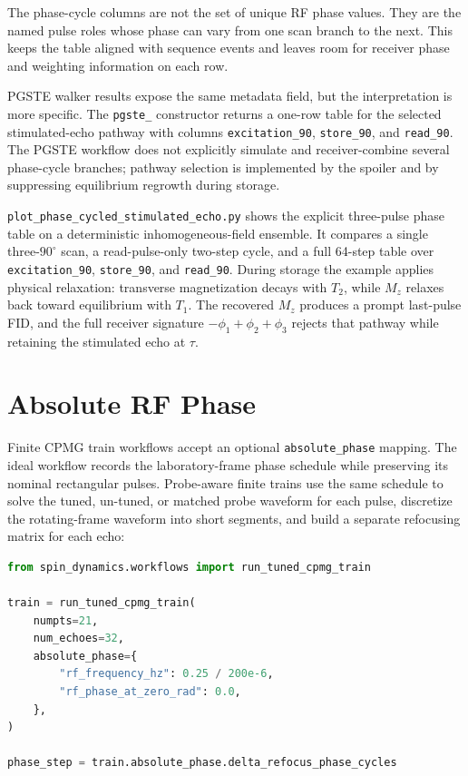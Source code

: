 \documentclass[11pt,oneside]{report}
\newcommand{\code}[1]{\texttt{#1}}
\begin{document}
The phase-cycle columns are not the set of unique RF phase values. They are the
named pulse roles whose phase can vary from one scan branch to the next. This
keeps the table aligned with sequence events and leaves room for receiver phase
and weighting information on each row.

PGSTE walker results expose the same metadata field, but the interpretation is
more specific. The \code{pgste\_} constructor returns a one-row table for the
selected stimulated-echo pathway with columns \code{excitation\_90},
\code{store\_90}, and \code{read\_90}. The PGSTE workflow does not explicitly
simulate and receiver-combine several phase-cycle branches; pathway selection is
implemented by the spoiler and by suppressing equilibrium regrowth during
storage.

\code{plot\_phase\_cycled\_stimulated\_echo.py} shows the explicit three-pulse
phase table on a deterministic inhomogeneous-field ensemble. It compares a
single three-\(90^\circ\) scan, a read-pulse-only two-step cycle, and a full
64-step table over \code{excitation\_90}, \code{store\_90}, and
\code{read\_90}. During storage the example applies physical relaxation:
transverse magnetization decays with \(T_2\), while \(M_z\) relaxes back toward
equilibrium with \(T_1\). The recovered \(M_z\) produces a prompt last-pulse
FID, and the full receiver signature \(-\phi_1+\phi_2+\phi_3\) rejects that
pathway while retaining the stimulated echo at \(\tau\).

\section{Absolute RF Phase}

Finite CPMG train workflows accept an optional \code{absolute\_phase}
mapping.  The ideal workflow records the laboratory-frame phase schedule while
preserving its nominal rectangular pulses.  Probe-aware finite trains use the
same schedule to solve the tuned, un-tuned, or matched probe waveform for each
pulse, discretize the rotating-frame waveform into short segments, and build a
separate refocusing matrix for each echo:

\begin{lstlisting}[language=Python]
from spin_dynamics.workflows import run_tuned_cpmg_train

train = run_tuned_cpmg_train(
    numpts=21,
    num_echoes=32,
    absolute_phase={
        "rf_frequency_hz": 0.25 / 200e-6,
        "rf_phase_at_zero_rad": 0.0,
    },
)

phase_step = train.absolute_phase.delta_refocus_phase_cycles
\end{lstlisting}
\end{document}
